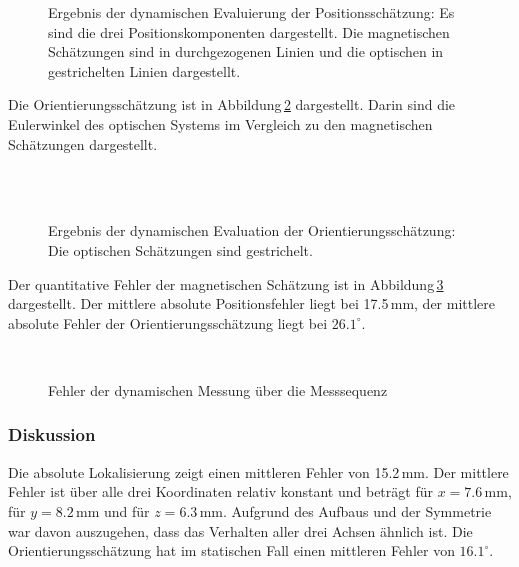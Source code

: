 \begin{figure}[h]
  \centering
  \caption{Ergebnis der dynamischen Evaluierung der Positionsschätzung: Es sind die drei Positionskomponenten dargestellt. Die magnetischen Schätzungen sind in durchgezogenen Linien und die optischen in gestrichelten Linien dargestellt.}
  \label{fig:DynAbsPos}
\end{figure}
Die Orientierungsschätzung ist in Abbildung\,\ref{fig:DynAbsAngle} dargestellt. Darin sind die Eulerwinkel des optischen Systems im Vergleich zu den magnetischen Schätzungen dargestellt.
\begin{figure}[h]
  \centering
  \\
  \\
  \caption{Ergebnis der dynamischen Evaluation der Orientierungsschätzung: Die optischen Schätzungen sind gestrichelt. }
  \label{fig:DynAbsAngle}
\end{figure}

Der quantitative Fehler der magnetischen Schätzung ist in Abbildung\,\ref{fig:ErrorAbsLocal} dargestellt. Der mittlere absolute Positionsfehler liegt bei 17.5\,mm, der mittlere absolute Fehler der Orientierungsschätzung liegt bei $26.1^\circ$.
\begin{figure}[h]
  \centering
  \\
  \caption{Fehler der dynamischen Messung über die Messsequenz}
  \label{fig:ErrorAbsLocal}
\end{figure}
  
\subsubsection{Diskussion}
Die absolute Lokalisierung zeigt einen mittleren Fehler von 15.2\,mm. Der mittlere Fehler ist über alle drei Koordinaten relativ konstant und beträgt für $x = 7.6\,\text{mm}$, für $y = 8.2\,\text{mm}$ und für $z = 6.3\,\text{mm}$. Aufgrund des Aufbaus und der Symmetrie war davon auszugehen, dass das Verhalten aller drei Achsen ähnlich ist. Die Orientierungsschätzung hat im statischen Fall einen mittleren Fehler von $16.1^\circ$. 

